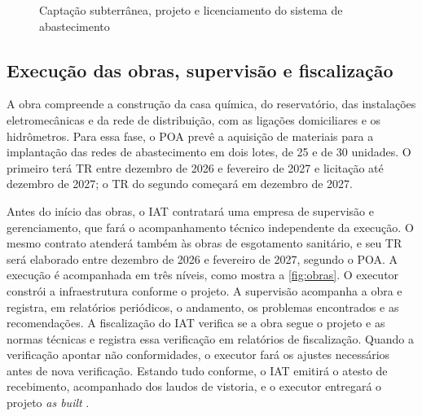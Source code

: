 \begin{figure}[htbp]
  \centering
  \caption{Captação subterrânea, projeto e licenciamento do sistema de abastecimento}
  \label{fig:captacao-projeto}
\end{figure}


\subsection{Execução das obras, supervisão e fiscalização}
\label{subsec:obras}

A obra compreende a construção da casa química, do reservatório, das
instalações eletromecânicas e da rede de distribuição, com as ligações
domiciliares e os hidrômetros. Para essa fase, o POA prevê a aquisição de
materiais para a implantação das redes de abastecimento em dois lotes, de 25
e de 30 unidades. O primeiro terá TR entre dezembro de 2026 e fevereiro de
2027 e licitação até dezembro de 2027; o TR do segundo começará em dezembro
de 2027.

Antes do início das obras, o IAT contratará uma empresa de supervisão e
gerenciamento, que fará o acompanhamento técnico independente da execução.
O mesmo contrato atenderá também às obras de esgotamento sanitário, e seu TR
será elaborado entre dezembro de 2026 e fevereiro de 2027, segundo o POA. A
execução é acompanhada em três níveis, como mostra a \autoref{fig:obras}. O
executor constrói a infraestrutura conforme o projeto. A supervisão
acompanha a obra e registra, em relatórios periódicos, o andamento, os
problemas encontrados e as recomendações. A fiscalização do IAT verifica se
a obra segue o projeto e as normas técnicas e registra essa verificação em
relatórios de fiscalização. Quando a verificação apontar não conformidades,
o executor fará os ajustes necessários antes de nova verificação. Estando
tudo conforme, o IAT emitirá o atesto de recebimento, acompanhado dos laudos
de vistoria, e o executor entregará o projeto \textit{as built}
\cite{mop2026}.

